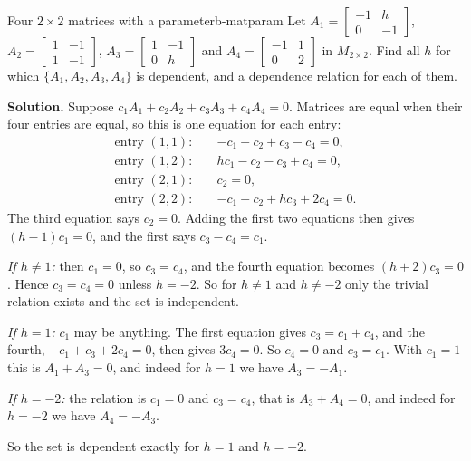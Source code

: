 \documentclass[11pt]{article}
\begin{document}
\begin{exmp}{Four $2\times2$ matrices with a parameter}{b-matparam}
Let $A_1=\begin{bmatrix}-1&h\\0&-1\end{bmatrix}$, $A_2=\begin{bmatrix}1&-1\\1&-1\end{bmatrix}$, $A_3=\begin{bmatrix}1&-1\\0&h\end{bmatrix}$ and $A_4=\begin{bmatrix}-1&1\\0&2\end{bmatrix}$ in $M_{2\times2}$. Find all $h$ for which $\{A_1,A_2,A_3,A_4\}$ is dependent, and a dependence relation for each of them.

\textbf{Solution.} Suppose $c_1A_1+c_2A_2+c_3A_3+c_4A_4=0$. Matrices are equal when their four entries are equal, so this is one equation for each entry:
\begin{align*}
\text{entry }(1,1):\quad & -c_1+c_2+c_3-c_4=0,\\
\text{entry }(1,2):\quad & hc_1-c_2-c_3+c_4=0,\\
\text{entry }(2,1):\quad & c_2=0,\\
\text{entry }(2,2):\quad & -c_1-c_2+hc_3+2c_4=0.
\end{align*}
The third equation says $c_2=0$. Adding the first two equations then gives $(h-1)c_1=0$, and the first says $c_3-c_4=c_1$.

\emph{If $h\neq1$:} then $c_1=0$, so $c_3=c_4$, and the fourth equation becomes $(h+2)c_3=0$. Hence $c_3=c_4=0$ unless $h=-2$. So for $h\neq1$ and $h\neq-2$ only the trivial relation exists and the set is independent.

\emph{If $h=1$:} $c_1$ may be anything. The first equation gives $c_3=c_1+c_4$, and the fourth, $-c_1+c_3+2c_4=0$, then gives $3c_4=0$. So $c_4=0$ and $c_3=c_1$. With $c_1=1$ this is $A_1+A_3=0$, and indeed for $h=1$ we have $A_3=-A_1$.

\emph{If $h=-2$:} the relation is $c_1=0$ and $c_3=c_4$, that is $A_3+A_4=0$, and indeed for $h=-2$ we have $A_4=-A_3$.

So the set is dependent exactly for $h=1$ and $h=-2$.
\end{exmp}
\end{document}
